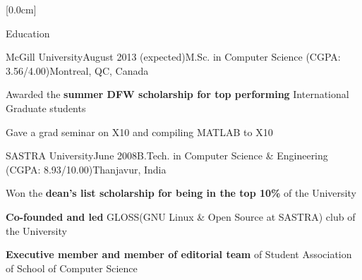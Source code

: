 \documentclass{resume} %
\begin{document}
[0.0cm]
 \begin{rSection}{Education}

\begin{rSubsection}{McGill University}{August 2013 (expected)}{M.Sc. in Computer Science (CGPA: 3.56/4.00)}{Montreal, QC, Canada}

\item Awarded the  \textbf{summer DFW scholarship for top performing} International Graduate students
\item Gave a grad seminar on X10 and compiling MATLAB to X10

\end{rSubsection}
\begin{rSubsection}{SASTRA University}{June 2008}{B.Tech. in Computer Science \& Engineering (CGPA: 8.93/10.00)}{Thanjavur, India}

\item Won the  \textbf{dean's list scholarship for being in the top 10\% }of the University 
\item  \textbf{Co-founded and led} GLOSS(GNU Linux \& Open Source at SASTRA) club of the University
\item  \textbf{Executive member and member of editorial team} of Student Association of School of Computer Science 

\end{rSubsection}

\end{rSection}
\end{document}
